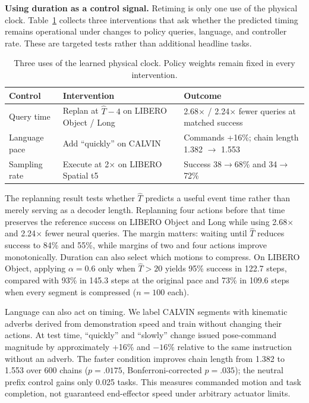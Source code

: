 \textbf{Using duration as a control signal.} Retiming is only one use of the physical clock. Table~\ref{tab:clock_uses} collects three interventions that ask whether the predicted timing remains operational under changes to policy queries, language, and controller rate. These are targeted tests rather than additional headline tasks.

\begin{table}[t]
\centering
\caption{Three uses of the learned physical clock. Policy weights remain fixed in every intervention.}
\label{tab:clock_uses}
\setlength{\tabcolsep}{10pt}
\begin{tabular}{lll}
\toprule
Control & Intervention & Outcome \\
\midrule
Query time & Replan at $\widehat T-4$ on LIBERO Object / Long & 2.68$\times$ / 2.24$\times$ fewer queries at matched success \\
Language pace & Add ``quickly'' on CALVIN & Commands +16\%; chain length 1.382 $\rightarrow$ 1.553 \\
Sampling rate & Execute at 2$\times$ on LIBERO Spatial t5 & Success 38$\rightarrow$68\% and 34$\rightarrow$72\% \\
\bottomrule
\end{tabular}
\end{table}

The replanning result tests whether $\widehat T$ predicts a useful event time rather than merely serving as a decoder length. Replanning four actions before that time preserves the reference success on LIBERO Object and Long while using 2.68$\times$ and 2.24$\times$ fewer neural queries. The margin matters: waiting until $\widehat T$ reduces success to 84\% and 55\%, while margins of two and four actions improve monotonically. Duration can also select which motions to compress. On LIBERO Object, applying $\alpha=0.6$ only when $\widehat T>20$ yields 95\% success in 122.7 steps, compared with 93\% in 145.3 steps at the original pace and 73\% in 109.6 steps when every segment is compressed ($n=100$ each).

Language can also act on timing. We label CALVIN segments with kinematic adverbs derived from demonstration speed and train without changing their actions. At test time, ``quickly'' and ``slowly'' change issued pose-command magnitude by approximately +16\% and $-16\%$ relative to the same instruction without an adverb. The faster condition improves chain length from 1.382 to 1.553 over 600 chains ($p=.0175$, Bonferroni-corrected $p=.035$); the neutral prefix control gains only 0.025 tasks. This measures commanded motion and task completion, not guaranteed end-effector speed under arbitrary actuator limits.

